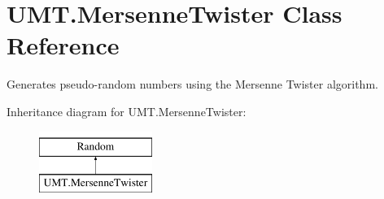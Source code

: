 \hypertarget{class_u_m_t_1_1_mersenne_twister}{\section{U\+M\+T.\+Mersenne\+Twister Class Reference}
\label{class_u_m_t_1_1_mersenne_twister}
}


Generates pseudo-\/random numbers using the Mersenne Twister algorithm.  


Inheritance diagram for U\+M\+T.\+Mersenne\+Twister\+:\begin{figure}[H]
\begin{center}
\leavevmode
\includegraphics[height=2.000000cm]{class_u_m_t_1_1_mersenne_twister}
\end{center}
\end{figure}
